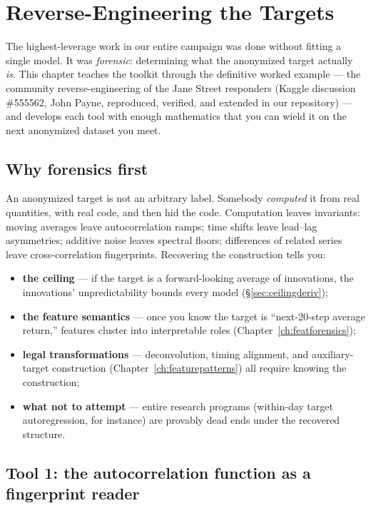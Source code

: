 \chapter{Reverse-Engineering the Targets}
\label{ch:targets}

The highest-leverage work in our entire campaign was done without fitting a
single model. It was \emph{forensic}: determining what the anonymized target
actually \emph{is}. This chapter teaches the toolkit through the definitive
worked example --- the community reverse-engineering of the Jane Street
responders (Kaggle discussion \#555562, John Payne, reproduced, verified, and
extended in our repository) --- and develops each tool with enough
mathematics that you can wield it on the next anonymized dataset you meet.

\section{Why forensics first}

An anonymized target is not an arbitrary label. Somebody \emph{computed} it
from real quantities, with real code, and then hid the code. Computation
leaves invariants: moving averages leave autocorrelation ramps; time shifts
leave lead--lag asymmetries; additive noise leaves spectral floors;
differences of related series leave cross-correlation fingerprints. Recovering
the construction tells you:

\begin{itemize}
\item \textbf{the ceiling} --- if the target is a forward-looking average of
  innovations, the innovations' unpredictability bounds every model
  (\S\ref{sec:ceilingderiv});
\item \textbf{the feature semantics} --- once you know the target is
  ``next-20-step average return,'' features cluster into interpretable roles
  (Chapter~\ref{ch:featforensics});
\item \textbf{legal transformations} --- deconvolution, timing alignment,
  and auxiliary-target construction (Chapter~\ref{ch:featurepatterns}) all
  require knowing the construction;
\item \textbf{what not to attempt} --- entire research programs (within-day
  target autoregression, for instance) are provably dead ends under the
  recovered structure.
\end{itemize}

\section{Tool 1: the autocorrelation function as a fingerprint reader}
\label{sec:acf}

